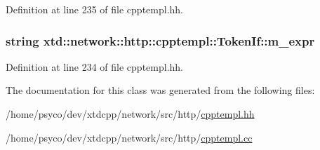 Definition at line 235 of file cpptempl.\+hh.

\subsubsection[{\texorpdfstring{m\+\_\+expr}{m_expr}}]{\setlength{\rightskip}{0pt plus 5cm}string xtd\+::network\+::http\+::cpptempl\+::\+Token\+If\+::m\+\_\+expr}\hypertarget{classxtd_1_1network_1_1http_1_1cpptempl_1_1TokenIf_a1d1181e1717358dd9e1a37387dfd5454}{}\label{classxtd_1_1network_1_1http_1_1cpptempl_1_1TokenIf_a1d1181e1717358dd9e1a37387dfd5454}


Definition at line 234 of file cpptempl.\+hh.



The documentation for this class was generated from the following files\+:\begin{DoxyCompactItemize}
\item 
/home/psyco/dev/xtdcpp/network/src/http/\hyperlink{cpptempl_8hh}{cpptempl.\+hh}\item 
/home/psyco/dev/xtdcpp/network/src/http/\hyperlink{cpptempl_8cc}{cpptempl.\+cc}\end{DoxyCompactItemize}
